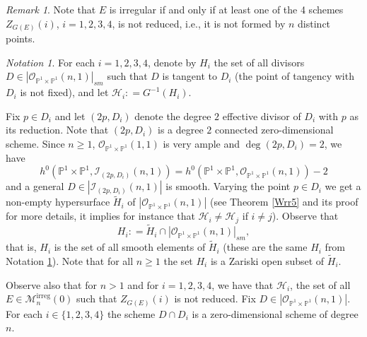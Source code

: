 \documentclass[
  a4paper, 
  reqno, 
  oneside, 
  11pt
]{amsart}
\theoremstyle{plain}	%
\theoremstyle{mydef} %
\theoremstyle{remark}
\newtheorem{remark}{Remark}
\newtheorem{notation}{Notation}
\theoremstyle{definition}
\theoremstyle{remark}
\DeclareMathOperator{\irreg}{irreg}
\newcommand{\ce}{\mathrel{\mathop:}=}
\begin{document}
  \begin{remark}
Note that $E$ is irregular if and only if at least one of the 4 schemes $Z_{G(E)}(i)$, $i=1,2,3,4$, is not reduced, i.e., it is not formed by $n$ distinct points.
\end{remark}

\begin{notation}\label{defH} For each $i=1,2,3,4$, denote by  $H_i$  the set of all divisors 
$D\in |\mathcal O_{\mathbb P^1\times \mathbb P^1}(n,1)|_{sm}$ such that $D$ is tangent to $D_i$ 
(the point of tangency with $D_i$ is not fixed), and let $\mathcal H_i\ce G^{-1}(H_i)$.
\end{notation}


Fix $p\in D_i$ and let $(2p,D_i)$ denote the degree $2$ effective divisor of $D_i$ with $p$ as its reduction. Note that $(2p,D_i)$ is a degree $2$ connected zero-dimensional scheme. Since $n\ge 1$, $\mathcal O_{\mathbb P^1\times\mathbb P^1}(1,1)$ is very ample and $\deg(2p,D_i)=2$, we have $$h^0(\mathbb P^1\times \mathbb P^1,\mathcal I_{(2p,D_i)}(n,1))=
h^0(\mathbb P^1\times \mathbb P^1,\mathcal O_{\mathbb P^1\times \mathbb P^1}(n,1))-2$$
 and a general $D\in |\mathcal I_{(2p,D_i)}(n,1)|$ is smooth. 
Varying the point $p\in D_i$ we get  a non-empty hypersurface $\tilde{H}_i$ of $|\mathcal O_{\mathbb P^1\times \mathbb P^1}(n,1)|$ (see Theorem \ref{Wrr5} and its proof for more details, it implies for instance that $\mathcal H_i\ne \mathcal H_j$ if $i\ne j$).
Observe that $$H_i\ce \tilde{H}_i\cap |\mathcal O_{\mathbb P^1\times \mathbb P^1}(n,1)|_{sm},$$ that is, 
  $H_i$ is the set of all smooth elements of $\tilde{H}_i$ (these are the same $H_i$ from Notation \ref{defH}). Note that for all $n\ge 1$ the set $H_i$ is a Zariski open subset of $\tilde{H}_i$. 

Observe also  that for  $n>1$ and for $i=1,2,3,4$, we have that $\mathcal H_i$,  
the set of all $E\in \mathcal M_n^{\irreg}(0)$ such that $Z_{G(E)}(i)$ is not reduced. Fix $D\in |\mathcal O_{\mathbb P^1\times \mathbb P^1}(n,1)|$. For each $i\in \{1,2,3,4\}$
the scheme $D\cap D_i$ is a zero-dimensional scheme of degree $n$. 
\end{document}
